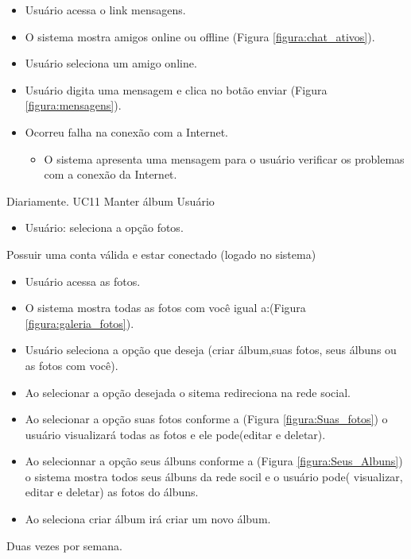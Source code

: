 {}
{
\begin{itemize}
	\item Usuário acessa o link mensagens.
	\item O sistema mostra amigos online ou offline (Figura \ref{figura:chat_ativos}).
	\item Usuário seleciona um amigo online.
	\item Usuário digita uma mensagem e clica no botão enviar (Figura \ref{figura:mensagens}).
\end{itemize}
}
{
\begin{itemize}
	\item Ocorreu falha na conexão com a Internet.
	\begin{itemize}
	\item O sistema apresenta uma mensagem para o usuário verificar os problemas com a conexão da Internet.
	\end{itemize}
\end{itemize}
}
{Diariamente.}
{
}
\casoDeUso
{UC11}
{Manter álbum}
{Usuário}
{
\begin{itemize}
	\item Usuário: seleciona a opção fotos.
	
\end{itemize}

}
 {Possuir uma conta válida e estar conectado (logado no sistema)}
{}
{
\begin{itemize}
	\item Usuário acessa as fotos.
	\item O sistema mostra todas as fotos com você igual a:(Figura \ref{figura:galeria_fotos}).
	\item Usuário seleciona a opção que deseja (criar álbum,suas fotos, seus álbuns ou as fotos com você).
	\item Ao selecionar a opção desejada o sitema redireciona na rede social.
\end{itemize}
}
{
\begin{itemize}
	\item Ao selecionar a opção suas fotos conforme a (Figura \ref{figura:Suas_fotos}) o usuário visualizará todas as fotos e ele pode(editar e deletar).
	\item Ao selecionnar a opção seus álbuns conforme a (Figura \ref{figura:Seus_Albuns}) o sistema mostra todos seus álbuns da rede socil e o usuário pode( visualizar, editar e deletar) as fotos do álbuns.
	\item Ao seleciona criar álbum irá criar um novo álbum.
	
\end{itemize}
}
{Duas vezes por semana.}
{

}

